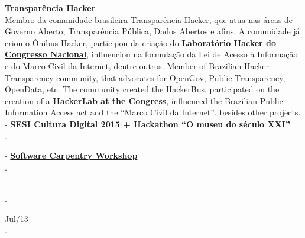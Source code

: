 \documentclass[]{friggeri-cv}
\begin{document}
\textbf{Transparência Hacker }\\
%
{Membro da comunidade brasileira Transparência Hacker, que atua nas áreas de Governo Aberto, Transparência Pública, Dados Abertos e afins. A comunidade já criou o Ônibus Hacker, participou da criação do \href{http://blog.openingparliament.org/post/72099651071/a-permanent-hacker-space-in-the-brazilian-congress}{\textbf{Laboratório Hacker do Congresso Nacional}}, influenciou na formulação da Lei de Acesso à Informação e do Marco Civil da Internet, dentre outros.}%
{Member of Brazilian Hacker Transparency community, that advocates for OpenGov, Public Transparency, OpenData, etc. The community created the HackerBus, participated on the creation of a \href{http://blog.openingparliament.org/post/72099651071/a-permanent-hacker-space-in-the-brazilian-congress}{\textbf{HackerLab at the Congress}}, influenced the Brazilian Public Information Access act and the ``Marco Civil da Internet'', besides other projects.}
{\footnotesize{}} - \href{http://www.hackagenda.com.br/evento/sesi-cultura-digital-2015-hackathon-o-museu-do-seculo-xxi/}{\textbf{SESI Cultura Digital 2015 + Hackathon “O museu do século XXI”}}\\
.

{\footnotesize{}} - \href{http://rgaiacs.github.io/2015-09-10-usp/}{\textbf{Software Carpentry Workshop}}\\
.

{\footnotesize{}} - \href{https://portaldoaluno.casperlibero.edu.br/agenda-eventos/semana-de-jornalismo-casper-libero-2/}{\textbf{}}\\
.

{\footnotesize{Jul/13}} - \href{http://abraji.org.br/congresso/}{\textbf{}}\\
.
\end{document}
